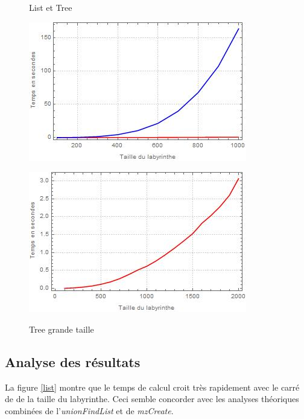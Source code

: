 \documentclass[10pt]{article}
\begin{document}
\begin{figure}[ht]
\begin{minipage}[h]{0.4\textwidth}
  \caption{List et Tree}
    \includegraphics[width=\textwidth]{List_Tree_graph.jpg} 
  \label{listtree}   
  \end{minipage}
  \hfill
  \begin{minipage}[h]{0.4\textwidth}
  \caption{Tree grande taille}
    \includegraphics[width=\textwidth]{Tree_big_graph.jpg}
  \label{treebig}
  \end{minipage}
\end{figure}

\subsection{Analyse des résultats}
La figure \ref{list} montre que le temps de calcul croit très rapidement avec le carré de de la taille du labyrinthe. Ceci semble concorder avec les analyses théoriques combinées de l'\emph{unionFindList} et de \emph{mzCreate}.
\end{document}

